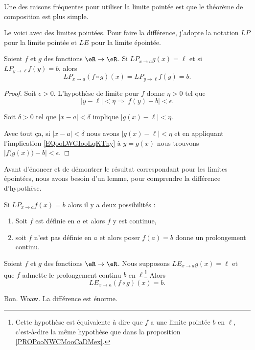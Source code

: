 Une des raisons fréquentes pour utiliser la limite pointée est que le théorème de composition est plus simple\cite{BIBooDILKooUcmUVD}.

Le voici avec des limites pointées. Pour faire la différence, j'adopte la notation \( {LP}\) pour la limite pointée et \( {LE}\) pour la limite épointée.
\begin{proposition}     \label{PROPooCQZZooMiZfQE}
    Soient \( f\) et \( g\) des fonctions \( \eR\to \eR\). Si \( {LP}_{x\to a}g(x)=\ell\) et si \( {LP}_{y\to \ell}f(y)=b\), alors
    \begin{equation}
        {LP}_{x\to a} (f\circ g)(x)={LP}_{y\to \ell} f(y)=b.
    \end{equation}
\end{proposition}

\begin{proof}
    Soit \( \epsilon>0\). L'hypothèse de limite pour \( f\) donne \( \eta>0\) tel que 
    \begin{equation}        \label{EQooLWGIooLqKThy}
        | y-\ell |<\eta \Rightarrow | f(y)-b |<\epsilon.
    \end{equation}

    Soit \( \delta>0\) tel que \( | x-a |<\delta\) implique \( | g(x)-\ell |<\eta\).

    Avec tout ça, si \( | x-a |<\delta\) nous avons \( | g(x)-\ell |<\eta\) et en appliquant l'implication \eqref{EQooLWGIooLqKThy} à \( y=g(x)\) nous trouvons \( | f\big( g(x) \big)-b |<\epsilon\).
\end{proof}

Avant d'énoncer et de démontrer le résultat correspondant pour les limites épointées, nous avons besoin d'un lemme, pour comprendre la différence d'hypothèse.

\begin{lemma}
    Si \( {LP}_{x\to a}f(x)=b\) alors il y a deux possibilités : 
    \begin{enumerate}
        \item
            Soit \( f\) est définie en \( a\) et alors \( f\) y est continue,
        \item 
            soit \( f\) n'est pas définie en \( a\) et alors poser \( f(a)=b\) donne un prolongement continu.
    \end{enumerate}
\end{lemma}

\begin{proposition}     \label{PROPooNWCMooCaDMex}
    Soient \( f\) et \( g\) des fonctions \( \eR\to \eR\). Nous supposons \( {LE}_{x\to a}g(x)=\ell\) et que \( f\) admette le prolongement continu \(b\) en \( \ell\)\footnote{Cette hypothèse est équivalente à dire que \( f\) a une limite pointée \( b\) en \( \ell\), c'est-à-dire la même hypothèse que dans la proposition \ref{PROPooNWCMooCaDMex}.} Alors
    \begin{equation}
        {LE}_{x\to a}(f\circ g)(x)=b.
    \end{equation}
\end{proposition}
Bon. Woaw. La différence est énorme.

